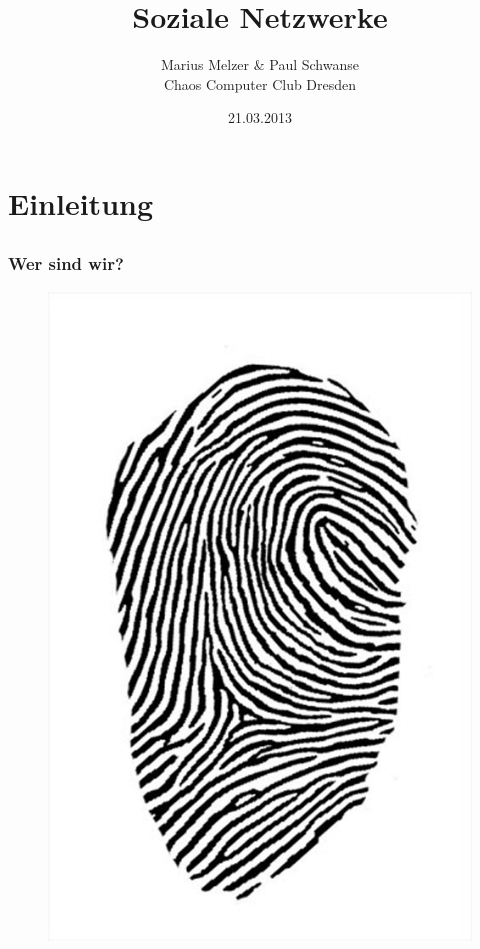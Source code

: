\documentclass[12pt]{beamer}
\title{Soziale Netzwerke}
\author{\small Marius Melzer \& Paul Schwanse\\\large Chaos Computer Club Dresden}
\date{21.03.2013}
\begin{document}
\maketitle

\section{Einleitung}
\subsection{}

\begin{frame}
  \frametitle{Wer sind wir?}
  \begin{figure}
    \includegraphics[height=0.7\textheight]{img/fingerabdruck.jpg}
  \end{figure}
\end{frame}
\end{document}
